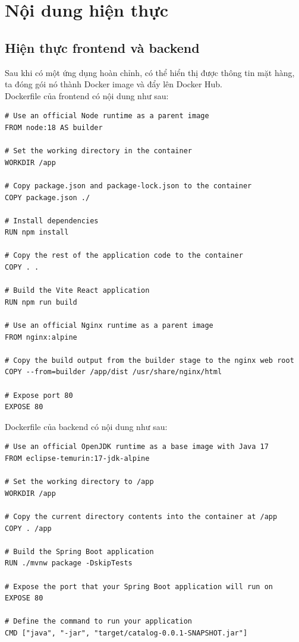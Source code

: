 \section{Nội dung hiện thực}
\subsection{Hiện thực frontend và backend}
\noindent Sau khi có một ứng dụng hoàn chỉnh, có thể hiển thị được thông tin mặt hàng, ta đóng gói nó thành Docker image và đẩy lên Docker Hub.\\[0.5cm]
Dockerfile của frontend có nội dung như sau:
\begin{lstlisting}[language=docker]
# Use an official Node runtime as a parent image
FROM node:18 AS builder

# Set the working directory in the container
WORKDIR /app

# Copy package.json and package-lock.json to the container
COPY package.json ./

# Install dependencies
RUN npm install

# Copy the rest of the application code to the container
COPY . .

# Build the Vite React application
RUN npm run build

# Use an official Nginx runtime as a parent image
FROM nginx:alpine

# Copy the build output from the builder stage to the nginx web root
COPY --from=builder /app/dist /usr/share/nginx/html

# Expose port 80
EXPOSE 80
\end{lstlisting}

Dockerfile của backend có nội dung như sau:

\begin{lstlisting}[language=docker]
# Use an official OpenJDK runtime as a base image with Java 17
FROM eclipse-temurin:17-jdk-alpine

# Set the working directory to /app
WORKDIR /app

# Copy the current directory contents into the container at /app
COPY . /app

# Build the Spring Boot application
RUN ./mvnw package -DskipTests

# Expose the port that your Spring Boot application will run on
EXPOSE 80

# Define the command to run your application
CMD ["java", "-jar", "target/catalog-0.0.1-SNAPSHOT.jar"]
\end{lstlisting}

